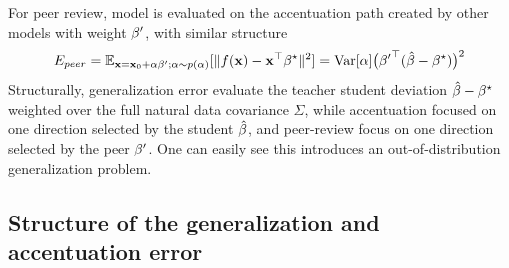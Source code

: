 \documentclass{article}
\theoremstyle{plain}
\theoremstyle{definition}
\theoremstyle{remark}
\begin{document}
For peer review, model is evaluated on the accentuation path created
by other models with weight ${\beta^{\prime}}$, with similar structure
\begin{equation}
    E_{peer}=\mathbb{E}_{\mathbf{x}=\mathbf{x}_{0}+\alpha{\beta^{\prime}};\alpha\sim p(\alpha)}[\|f(\mathbf{x})-\mathbf{x}^\top{\beta^{\star}}\|^2]=\mathrm{Var}[\alpha]\big({{\beta^{\prime}}}^{\top}(\hat{\beta}-{\beta^{\star}})\big)^{2}
    \label{eq:peer-path-error}
\end{equation}
Structurally, generalization error evaluate the teacher student deviation $\hat{\beta}-{\beta^{\star}}$ weighted over the full natural data covariance $\Sigma$, while accentuation focused on one direction selected by the student $\hat{\beta}$, and peer-review focus on one direction selected by the peer ${\beta^{\prime}}$. One can easily see this introduces an out-of-distribution generalization problem. 


\subsection{Structure of the generalization and accentuation error}
\label{sec:evaluation-metrics}
\end{document}
